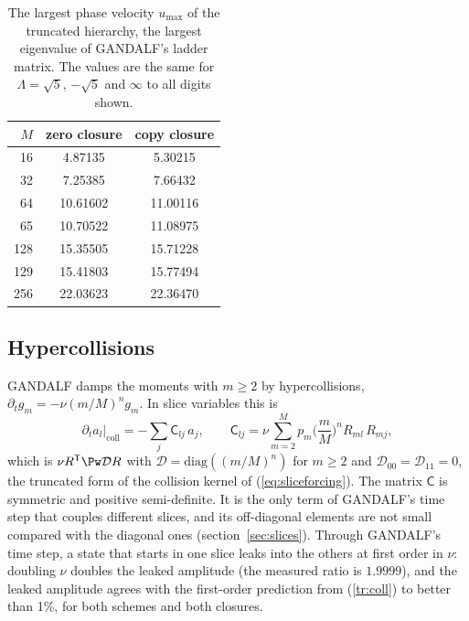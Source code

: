 \begin{table}[t]
  \centering
  \caption{The largest phase velocity $u_{\max}$ of the truncated hierarchy, the largest eigenvalue of GANDALF's ladder matrix. The values are the same for $\Lambda=\sqrt5$, $-\sqrt5$ and $\infty$ to all digits shown.}
  \label{tr:umaxtab}
  \begin{tabular}{@{}rcc@{}}
    \toprule
    $M$ & zero closure & copy closure \\
    \midrule
     16 &  4.87135 &  5.30215 \\
     32 &  7.25385 &  7.66432 \\
     64 & 10.61602 & 11.00116 \\
     65 & 10.70522 & 11.08975 \\
    128 & 15.35505 & 15.71228 \\
    129 & 15.41803 & 15.77494 \\
    256 & 22.03623 & 22.36470 \\
    \bottomrule
  \end{tabular}
\end{table}

\subsection{Hypercollisions}\label{tr:collsec}

GANDALF damps the moments with $m\ge2$ by hypercollisions, $\partial_tg_m=-\nu(m/M)^ng_m$. In slice variables this is
\begin{equation}\label{tr:coll}
  \partial_ta_l\big|_{\mathrm{coll}}=-\sum_j\mathsf C_{lj}\,a_j,\qquad
  \mathsf C_{lj}=\nu\sum_{m=2}^Mp_m\Big(\frac mM\Big)^nR_{ml}\,R_{mj},
\end{equation}
which is $\nu R^{\mathsf T}\Pw\mathcal DR$ with $\mathcal D=\mathrm{diag}((m/M)^n)$ for $m\ge2$ and $\mathcal D_{00}=\mathcal D_{11}=0$, the truncated form of the collision kernel of (\ref{eq:sliceforcing}). The matrix $\mathsf C$ is symmetric and positive semi-definite. It is the only term of GANDALF's time step that couples different slices, and its off-diagonal elements are not small compared with the diagonal ones (section~\ref{sec:slices}). Through GANDALF's time step, a state that starts in one slice leaks into the others at first order in $\nu$: doubling $\nu$ doubles the leaked amplitude (the measured ratio is $1.9999$), and the leaked amplitude agrees with the first-order prediction from (\ref{tr:coll}) to better than 1\%, for both schemes and both closures.

